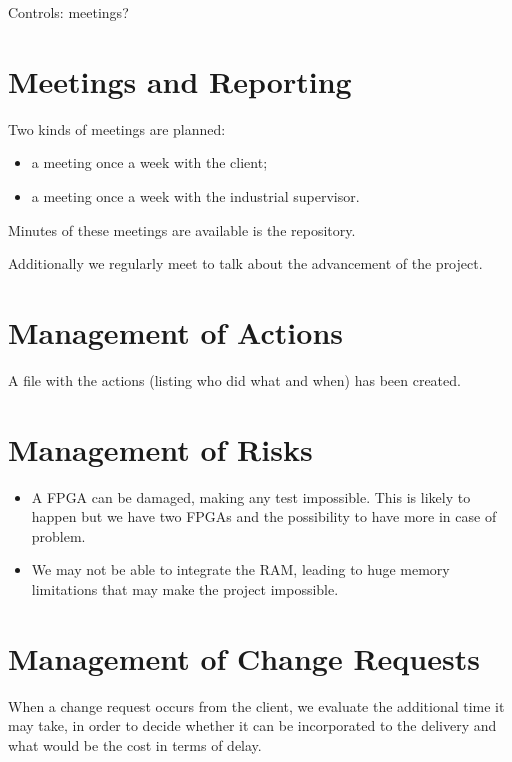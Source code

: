 \documentclass{article}
\begin{document}
    Controls: meetings?


  \section{Meetings and Reporting}
    Two kinds of meetings are planned:
    \begin{itemize}
        \item a meeting once a week with the client;
        \item a meeting once a week with the industrial supervisor.
    \end{itemize}
    Minutes of these meetings are available is the repository.

    Additionally we regularly meet to talk about the advancement of the project.

  \section{Management of Actions}
    A file with the actions (listing who did what and when) has been created.

  \section{Management of Risks}
    \begin{itemize}
      \item A FPGA can be damaged, making any test impossible. This is likely to
          happen but we have two FPGAs and the possibility to have more in case
          of problem.
      \item We may not be able to integrate the RAM, leading to huge memory
          limitations that may make the project impossible.
    \end{itemize}

  \section{Management of Change Requests}
    When a change request occurs from the client, we evaluate the additional
    time it may take, in order to decide whether it can be incorporated to the
    delivery and what would be the cost in terms of delay.
\end{document}
